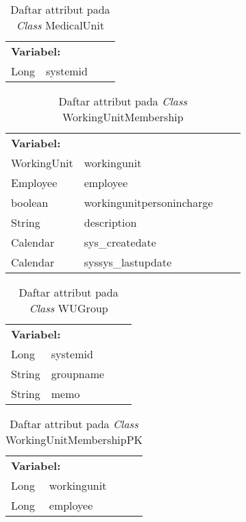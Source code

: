 \begin{table}[H]
	\caption{Daftar attribut pada \textit{Class} MedicalUnit}
	\centering
	\small
	\begin{adjustbox}{width=1\textwidth}	
		\begin{tabular}{|p{4cm} p{2.1cm} p{3cm} p{3.1cm}|}
			\hline
			\multicolumn{2}{|l}{\textbf{Variabel:}}&\multicolumn{2}{l|}{}\\
			Long&systemid&&\\
			\hline
		\end{tabular}
	\end{adjustbox}
\end{table}
\begin{table}[H]
	\caption{Daftar attribut pada \textit{Class} WorkingUnitMembership}
	\centering
	\small
	\begin{adjustbox}{width=1\textwidth}	
		\begin{tabular}{|p{4cm} p{2.1cm} p{3cm} p{3.1cm}|}
			\hline
			\multicolumn{2}{|l}{\textbf{Variabel:}}&\multicolumn{2}{l|}{}\\
			WorkingUnit&workingunit&&\\
			Employee&employee&&\\
			boolean&workingunitpersonincharge&&\\
			String&description&&\\
			Calendar&sys\_createdate&&\\
			Calendar&syssys\_lastupdate&&\\
			\hline
		\end{tabular}
	\end{adjustbox}
\end{table}
\begin{table}[H]
	\caption{Daftar attribut pada \textit{Class} WUGroup}
	\centering
	\small
	\begin{adjustbox}{width=1\textwidth}	
		\begin{tabular}{|p{4cm} p{2.1cm} p{3cm} p{3.1cm}|}
			\hline
			\multicolumn{2}{|l}{\textbf{Variabel:}}&\multicolumn{2}{l|}{}\\
			Long&systemid&&\\
			String&groupname&&\\
			String&memo&&\\
			\hline
		\end{tabular}
	\end{adjustbox}
\end{table}
\begin{table}[H]
	\caption{Daftar attribut pada \textit{Class} WorkingUnitMembershipPK}
	\centering
	\small
	\begin{adjustbox}{width=1\textwidth}	
		\begin{tabular}{|p{4cm} p{2.1cm} p{3cm} p{3.1cm}|}
			\hline
			\multicolumn{2}{|l}{\textbf{Variabel:}}&\multicolumn{2}{l|}{}\\
			Long&workingunit&&\\
			Long&employee&&\\
			\hline
		\end{tabular}
	\end{adjustbox}
\end{table}
